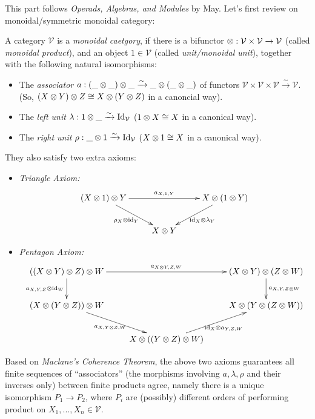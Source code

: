 \documentclass{article}
\begin{document}
This part follows \emph{Operads, Algebras, and Modules} by May. Let's first review on monoidal/symmetric monoidal category:
\begin{defn}
    A category $\mathcal{V}$ is a \emph{monoidal caetgory}, if there is a bifunctor $\otimes:\mathcal{V}\times\mathcal{V}\rightarrow\mathcal{V}$ (called \emph{monoidal product}), and an object $1\in\mathcal{V}$ (called \emph{unit/monoidal unit}), together with the following natural isomorphisms:
    \begin{itemize}
        \item The \emph{associator} $a:(\_\otimes \_)\otimes \_ \xrightarrow{\sim} \_\otimes(\_\otimes \_)$ of functors $\mathcal{V}\times\mathcal{V}\times\mathcal{V}\xrightarrow{\sim}\mathcal{V}$. (So, $(X\otimes Y)\otimes Z\cong X\otimes(Y\otimes Z)$ in a canoncial way).
        \item The \emph{left unit} $\lambda:1\otimes\_\xrightarrow{\sim} \mathrm{Id}_{\mathcal{V}}$ ($1\otimes X\cong X$ in a canonical way).
        \item The \emph{right unit} $\rho:\_\otimes 1\xrightarrow{\sim}\mathrm{Id}_\mathcal{V}$ ($X\otimes 1\cong X$ in a canonical way).
    \end{itemize}

    They also satisfy two extra axioms:
    \begin{itemize}
        \item \emph{Triangle Axiom:}
        \[\xymatrix{
            (X\tensor 1)\tensor Y \ar[dr]_-{\rho_X \tensor \id_Y} \ar[rr]^-{a_{X,1,Y}} && X\tensor (1\tensor Y) \ar[dl]^-{\id_X\tensor \lambda_Y}\\
            & X\tensor Y
        }\]
        \item \emph{Pentagon Axiom:}
        \[\xymatrix{
            ((X\tensor Y)\tensor Z)\tensor W \ar[rr]^-{a_{X\tensor Y,Z,W}} \ar[d]_-{a_{X,Y,Z}\tensor \id_W} && (X\tensor Y)\tensor(Z\tensor W) \ar[d]^-{a_{X,Y,Z\tensor W}}\\
            (X\tensor (Y\tensor Z))\tensor W \ar[dr]_-{a_{X,Y\tensor Z,W}} && X\tensor (Y\tensor (Z\tensor W)) \\
            & X\tensor ((Y\tensor Z)\tensor W) \ar[ur]_-{\id_X\tensor a_{Y,Z,W}}
        }\]
    \end{itemize}
\end{defn}
Based on \emph{Maclane's Coherence Theorem}, the above two axioms guarantees all finite sequences of ``associators'' (the morphisms involving $a,\lambda,\rho$ and their inverses only) between finite products agree, namely there is a unique isomorphism $P_1\rightarrow P_2$, where $P_i$ are (possibly) different orders of performing product on $X_1,...,X_n\in\mathcal{V}$.
\end{document}

